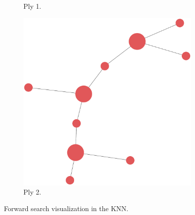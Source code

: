 \documentclass[titlepage,11pt]{article}
\begin{document}
\begin{figure}
\begin{subfigure}[!htb]{0.32\textwidth}
		\caption{Ply 1.}
	\end{subfigure}
	\begin{subfigure}[!htb]{0.32\textwidth}
		\centering
		\includegraphics[width=\columnwidth]{figures/knn_simple_forward_think_2.pdf}
		\caption{Ply 2.}
	\end{subfigure}
	\caption{Forward search visualization in the KNN.}
	\label{fig:forward_search_test}
\end{figure}
\end{document}

